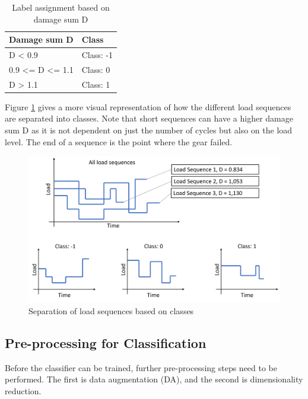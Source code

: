\begin{table}
	\begin{center}
		\begin{tabular}{|| l | l ||}
			\hline
			\rule{0pt}{2ex}Damage sum D & Class\\
			\hline
			\hline
			\rule{0pt}{2ex}D < 0.9 & Class: -1\\\hline
			0.9 <= D <= 1.1 & Class:  0\\	\hline
			D > 1.1 & Class:  1\\\hline
			\hline
		\end{tabular}
		\caption{Label assignment based on damage sum D}
		\label{DamageClass}
	\end{center}
	\vspace{-4mm}
\end{table}

\newpage
Figure \ref{fig:SBC1} gives a more visual representation of how the different load sequences are separated into classes. Note that short sequences can have a higher damage sum D as it is not dependent on just the number of cycles but also on the load level. The end of a sequence is the point where the gear failed. 

\begin{figure}[H]
	\centering
	\includegraphics[width=0.9\linewidth]{IMGs/SBC1.png}
	\caption{Separation of load sequences based on classes}
	\label{fig:SBC1}
\end{figure}

\subsection{Pre-processing for Classification}\label{prep_class}
Before the classifier can be trained, further pre-processing steps need to be performed. The first is data augmentation (DA), and the second is dimensionality reduction. 

